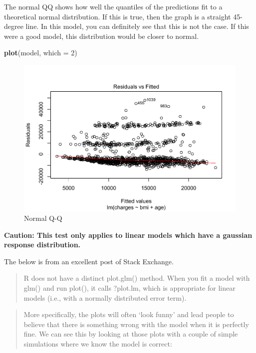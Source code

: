 \documentclass[]{book}
\newenvironment{Shaded}{\begin{snugshade}}{\end{snugshade}}
\newcommand{\DataTypeTok}[1]{\textcolor[rgb]{0.13,0.29,0.53}{#1}}
\newcommand{\DecValTok}[1]{\textcolor[rgb]{0.00,0.00,0.81}{#1}}
\newcommand{\KeywordTok}[1]{\textcolor[rgb]{0.13,0.29,0.53}{\textbf{#1}}}
\newcommand{\NormalTok}[1]{#1}
\begin{document}
The normal QQ shows how well the quantiles of the predictions fit to a theoretical normal distribution. If this is true, then the graph is a straight 45-degree line. In this model, you can definitely see that this is not the case. If this were a good model, this distribution would be closer to normal.

\begin{Shaded}
\begin{Highlighting}[]
\KeywordTok{plot}\NormalTok{(model, }\DataTypeTok{which =} \DecValTok{2}\NormalTok{)}
\end{Highlighting}
\end{Shaded}

\begin{figure}
\centering
\includegraphics{Exam-PA-Study-Manual_files/figure-latex/unnamed-chunk-85-1.pdf}
\caption{\label{fig:unnamed-chunk-85}Normal Q-Q}
\end{figure}

\textbf{Caution: This test only applies to linear models which have a gaussian response distribution.}

The below is from an excellent post of Stack Exchange.

\begin{quote}
R does not have a distinct plot.glm() method. When you fit a model with glm() and run plot(), it calls ?plot.lm, which is appropriate for linear models (i.e., with a normally distributed error term).
\end{quote}

\begin{quote}
More specifically, the plots will often `look funny' and lead people to believe that there is something wrong with the model when it is perfectly fine. We can see this by looking at those plots with a couple of simple simulations where we know the model is correct:
\end{quote}
\end{document}
